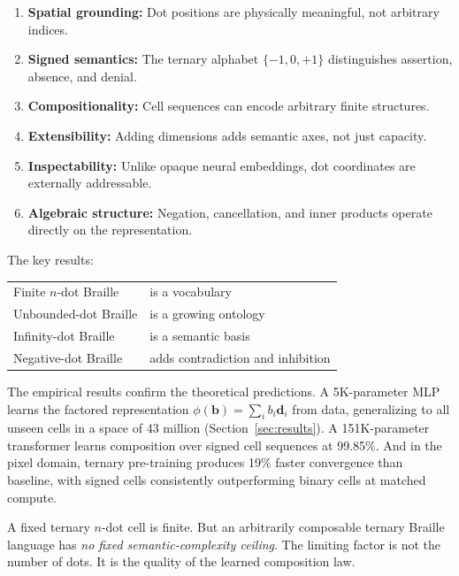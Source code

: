 \documentclass[11pt,a4paper]{article}
\newcommand{\bvec}{\bm{b}}
\newcommand{\dvec}{\bm{d}}
\begin{document}
\begin{enumerate}
  \item \textbf{Spatial grounding:}
    Dot positions are physically meaningful, not arbitrary indices.
  \item \textbf{Signed semantics:}
    The ternary alphabet $\{-1, 0, +1\}$ distinguishes
    assertion, absence, and denial.
  \item \textbf{Compositionality:}
    Cell sequences can encode arbitrary finite structures.
  \item \textbf{Extensibility:}
    Adding dimensions adds semantic axes, not just capacity.
  \item \textbf{Inspectability:}
    Unlike opaque neural embeddings, dot coordinates are
    externally addressable.
  \item \textbf{Algebraic structure:}
    Negation, cancellation, and inner products operate
    directly on the representation.
\end{enumerate}

The key results:

\medskip

\begin{center}
\begin{tabular}{@{}ll@{}}
  \toprule
  Finite $n$-dot Braille & is a vocabulary \\
  Unbounded-dot Braille & is a growing ontology \\
  Infinity-dot Braille & is a semantic basis \\
  Negative-dot Braille & adds contradiction and inhibition \\
  \bottomrule
\end{tabular}
\end{center}

\medskip

The empirical results confirm the theoretical predictions.
A 5K-parameter MLP learns the factored representation
$\phi(\bvec) = \sum_i b_i \dvec_i$ from data, generalizing
to all unseen cells in a space of 43 million (Section~\ref{sec:results}).
A 151K-parameter transformer learns composition over signed cell
sequences at 99.85\%.
And in the pixel domain, ternary pre-training produces
19\% faster convergence than baseline, with signed cells consistently
outperforming binary cells at matched compute.

A fixed ternary $n$-dot cell is finite.
But an arbitrarily composable ternary Braille language has
\emph{no fixed semantic-complexity ceiling}.
The limiting factor is not the number of dots.
It is the quality of the learned composition law.
\end{document}
